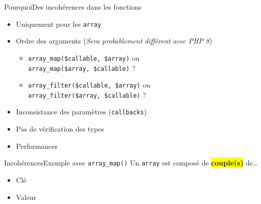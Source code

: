 \begin{frame}{Pourquoi}{Des incohérences dans les fonctions}
    \begin{itemize}[<+->]
        \item Uniquement pour les \texttt{array}
        \item Ordre des arguments (\textit{Sera probablement différent avec PHP 8})
        \begin{itemize}[<+->]
            \item \texttt{array\_map(\$callable, \$array)} ou \\ \texttt{array\_map(\$array, \$callable)} ?
            \item \texttt{array\_filter(\$callable, \$array)} ou \\ \texttt{array\_filter(\$array, \$callable)} ?
        \end{itemize}
        \item Inconsistance des paramètres (\texttt{callbacks})
        \item Pas de vérification des types
        \item Performances
    \end{itemize}
\end{frame}

\begin{frame}{Incohérences}{Exemple avec \texttt{array\_map()}}
    Un \texttt{array} est composé de \colorbox{yellow}{\textbf{couple(s)}} de\ldots

    \bigskip

    \begin{itemize}[<+->]
        \item<1-> Clé
        \item<2-> Valeur

    \end{itemize}
\end{frame}

